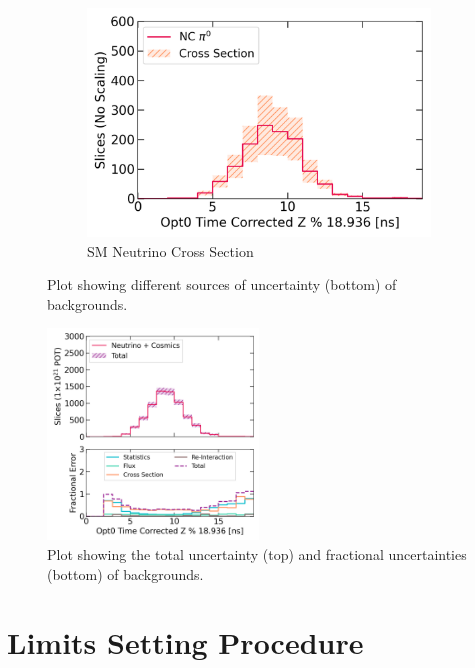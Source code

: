 \begin{figure}[htbp!]
\begin{subfigure}[b]{0.495\textwidth}
            \includegraphics[width=\textwidth]{ncpi0_xsec_err}
            \caption{SM Neutrino Cross Section}%
            \label{fig:bkg_xsec}
        \end{subfigure}
        \caption{
	Plot showing different sources of uncertainty (bottom) of backgrounds.
	}
        \label{fig:bkg_error}
	\vspace{0.5cm}
\centering    
\includegraphics[width=0.5\textwidth]{bkg_error}
\caption[bkg_error]{
Plot showing the total uncertainty (top) and fractional uncertainties (bottom) of backgrounds.
}
\label{fig:bkg_total_error}
\end{figure}

\section{Limits Setting Procedure}


